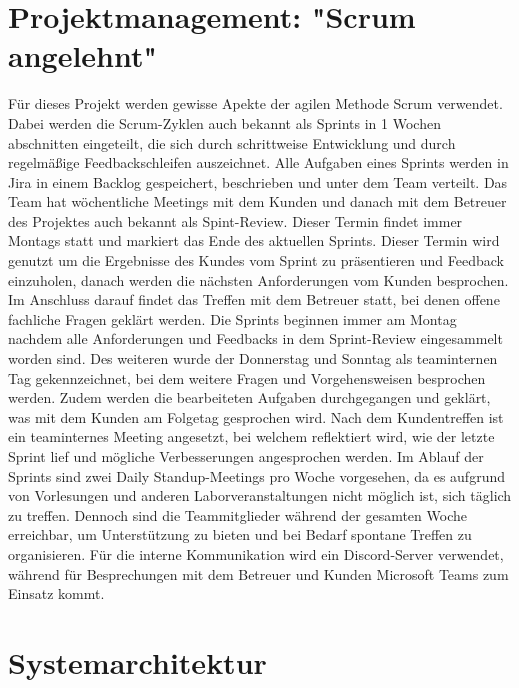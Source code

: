 \documentclass[a4paper,12pt]{article}
\begin{document}
\section{Projektmanagement: "Scrum angelehnt"}
Für dieses Projekt werden gewisse Apekte der agilen Methode Scrum verwendet. Dabei werden die Scrum-Zyklen auch bekannt als Sprints in 1 Wochen abschnitten eingeteilt, die sich durch schrittweise Entwicklung und durch regelmäßige Feedbackschleifen auszeichnet. Alle Aufgaben eines Sprints werden in Jira in einem Backlog gespeichert, beschrieben und unter dem Team verteilt. Das Team hat wöchentliche Meetings mit dem Kunden und danach mit dem Betreuer des Projektes auch bekannt als Spint-Review. Dieser Termin findet immer Montags statt und markiert das Ende des aktuellen Sprints. Dieser Termin wird genutzt um die Ergebnisse des Kundes vom Sprint zu präsentieren und Feedback einzuholen, danach werden die nächsten Anforderungen vom Kunden besprochen. Im Anschluss darauf findet das Treffen mit dem Betreuer statt, bei denen offene fachliche Fragen geklärt werden.  Die Sprints beginnen immer am Montag nachdem alle Anforderungen und Feedbacks in dem Sprint-Review eingesammelt worden sind. Des weiteren wurde der Donnerstag und Sonntag als teaminternen Tag gekennzeichnet, bei dem weitere Fragen und Vorgehensweisen besprochen werden. Zudem werden die bearbeiteten Aufgaben durchgegangen und geklärt, was mit dem Kunden am Folgetag gesprochen wird. Nach dem Kundentreffen ist ein teaminternes Meeting angesetzt, bei welchem reflektiert wird, wie der letzte Sprint lief und mögliche Verbesserungen angesprochen werden. Im Ablauf der Sprints sind zwei Daily Standup-Meetings pro Woche vorgesehen, da es aufgrund von Vorlesungen und anderen Laborveranstaltungen nicht möglich ist, sich täglich zu treffen. Dennoch sind die Teammitglieder während der gesamten Woche erreichbar, um Unterstützung zu bieten und bei Bedarf spontane Treffen zu organisieren. Für die interne Kommunikation wird ein Discord-Server verwendet, während für Besprechungen mit dem Betreuer und Kunden Microsoft Teams zum Einsatz kommt.

\newpage


\section{Systemarchitektur}

\end{document}
